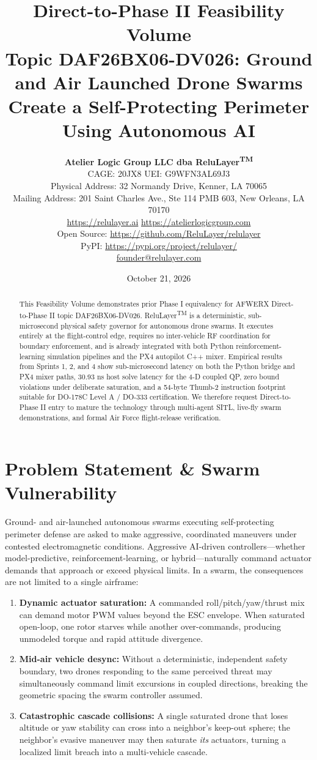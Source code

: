 \documentclass[11pt]{article}
\title{\textbf{Direct-to-Phase II Feasibility Volume}\\[0.5em]
\large Topic DAF26BX06-DV026: Ground and Air Launched Drone Swarms\\
Create a Self-Protecting Perimeter Using Autonomous AI}
\author{\textbf{Atelier Logic Group LLC dba ReluLayer\textsuperscript{TM}}\\
CAGE: 20JX8 \quad UEI: G9WFN3AL69J3\\
Physical Address: 32 Normandy Drive, Kenner, LA 70065\\
Mailing Address: 201 Saint Charles Ave., Ste 114 PMB 603, New Orleans, LA 70170\\
\url{https://relulayer.ai} \quad \url{https://atelierlogicgroup.com}\\
Open Source: \url{https://github.com/ReluLayer/relulayer}\\
PyPI: \url{https://pypi.org/project/relulayer/}\\
\href{mailto:founder@relulayer.com}{founder@relulayer.com}}
\date{October 21, 2026}
\begin{document}
\maketitle

\begin{abstract}
\noindent
This Feasibility Volume demonstrates prior Phase I equivalency for AFWERX Direct-to-Phase II topic DAF26BX06-DV026. ReluLayer\textsuperscript{TM} is a deterministic, sub-microsecond physical safety governor for autonomous drone swarms. It executes entirely at the flight-control edge, requires no inter-vehicle RF coordination for boundary enforcement, and is already integrated with both Python reinforcement-learning simulation pipelines and the PX4 autopilot C++ mixer. Empirical results from Sprints 1, 2, and 4 show sub-microsecond latency on both the Python bridge and PX4 mixer paths, 30.93 ns host solve latency for the 4-D coupled QP, zero bound violations under deliberate saturation, and a 54-byte Thumb-2 instruction footprint suitable for DO-178C Level A / DO-333 certification. We therefore request Direct-to-Phase II entry to mature the technology through multi-agent SITL, live-fly swarm demonstrations, and formal Air Force flight-release verification.
\end{abstract}

\section{Problem Statement \& Swarm Vulnerability}
\label{sec:problem}

Ground- and air-launched autonomous swarms executing self-protecting perimeter defense are asked to make aggressive, coordinated maneuvers under contested electromagnetic conditions. Aggressive AI-driven controllers---whether model-predictive, reinforcement-learning, or hybrid---naturally command actuator demands that approach or exceed physical limits. In a swarm, the consequences are not limited to a single airframe:

\begin{enumerate}[leftmargin=*]
    \item \textbf{Dynamic actuator saturation:} A commanded roll/pitch/yaw/thrust mix can demand motor PWM values beyond the ESC envelope. When saturated open-loop, one rotor starves while another over-commands, producing unmodeled torque and rapid attitude divergence.
    \item \textbf{Mid-air vehicle desync:} Without a deterministic, independent safety boundary, two drones responding to the same perceived threat may simultaneously command limit excursions in coupled directions, breaking the geometric spacing the swarm controller assumed.
    \item \textbf{Catastrophic cascade collisions:} A single saturated drone that loses altitude or yaw stability can cross into a neighbor's keep-out sphere; the neighbor's evasive maneuver may then saturate \textit{its} actuators, turning a localized limit breach into a multi-vehicle cascade.
\end{enumerate}
\end{document}
